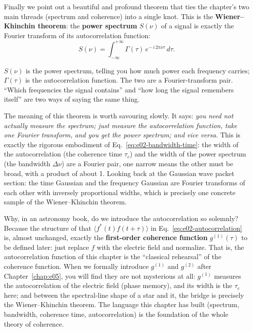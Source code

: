 Finally we point out a beautiful and profound theorem that ties the chapter's two main threads (spectrum and coherence) into a single knot. This is the \textbf{Wiener--Khinchin theorem}: the \textbf{power spectrum} \(S(\nu)\) of a signal is exactly the Fourier transform of its autocorrelation function:
\begin{equation}
  S(\nu)=\int_{-\infty}^{+\infty}\Gamma(\tau)\,e^{-\,i\,2\pi\nu\tau}\,d\tau .
  \label{eq:e02-wiener-khinchin}
\end{equation}
\begin{formulaexplain}
\(S(\nu)\) is the power spectrum, telling you how much power each frequency carries; \(\Gamma(\tau)\) is the autocorrelation function. The two are a Fourier-transform pair. ``Which frequencies the signal contains'' and ``how long the signal remembers itself'' are two ways of saying the same thing.
\end{formulaexplain}
The meaning of this theorem is worth savouring slowly. It says: \emph{you need not actually measure the spectrum; just measure the autocorrelation function, take one Fourier transform, and you get the power spectrum; and vice versa}. This is exactly the rigorous embodiment of Eq.~\eqref{eq:e02-bandwidth-time}: the width of the autocorrelation (the coherence time \(\tau_c\)) and the width of the power spectrum (the bandwidth \(\Delta\nu\)) are a Fourier pair, one narrow means the other must be broad, with a product of about 1. Looking back at the Gaussian wave packet section: the time Gaussian and the frequency Gaussian are Fourier transforms of each other with inversely proportional widths, which is precisely one concrete sample of the Wiener--Khinchin theorem.

Why, in an astronomy book, do we introduce the autocorrelation so solemnly? Because the structure of that \(\langle f^*(t)f(t+\tau)\rangle\) in Eq.~\eqref{eq:e02-autocorrelation} is, almost unchanged, exactly the \textbf{first-order coherence function} \(g^{(1)}(\tau)\) to be defined later: just replace \(f\) with the electric field and normalize. That is, the autocorrelation function of this chapter is the ``classical rehearsal'' of the coherence function. When we formally introduce \(g^{(1)}\) and \(g^{(2)}\) after Chapter~\ref{chap:e05}, you will find they are not mysterious at all: \(g^{(1)}\) measures the autocorrelation of the electric field (phase memory), and its width is the \(\tau_c\) here; and between the spectral-line shape of a star and it, the bridge is precisely the Wiener--Khinchin theorem. The language this chapter has built (spectrum, bandwidth, coherence time, autocorrelation) is the foundation of the whole theory of coherence.

